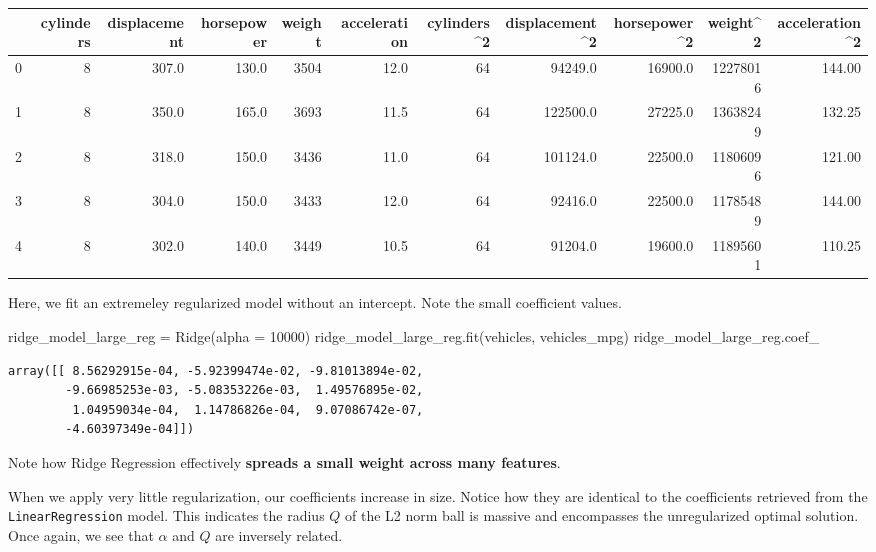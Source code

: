\documentclass[
  letterpaper,
  DIV=11,
  numbers=noendperiod]{scrreprt}
\newenvironment{Shaded}{\begin{snugshade}}{\end{snugshade}}
\newcommand{\DecValTok}[1]{\textcolor[rgb]{0.68,0.00,0.00}{#1}}
\newcommand{\NormalTok}[1]{\textcolor[rgb]{0.00,0.23,0.31}{#1}}
\newcommand{\OperatorTok}[1]{\textcolor[rgb]{0.37,0.37,0.37}{#1}}
\begin{document}
\begin{tabular}{lrrrrrrrrrr}
\toprule
{} &  cylinders &  displacement &  horsepower &  weight &  acceleration &  cylinders\textasciicircum 2 &  displacement\textasciicircum 2 &  horsepower\textasciicircum 2 &  weight\textasciicircum 2 &  acceleration\textasciicircum 2 \\
\midrule
0 &          8 &         307.0 &       130.0 &    3504 &          12.0 &           64 &         94249.0 &       16900.0 &  12278016 &          144.00 \\
1 &          8 &         350.0 &       165.0 &    3693 &          11.5 &           64 &        122500.0 &       27225.0 &  13638249 &          132.25 \\
2 &          8 &         318.0 &       150.0 &    3436 &          11.0 &           64 &        101124.0 &       22500.0 &  11806096 &          121.00 \\
3 &          8 &         304.0 &       150.0 &    3433 &          12.0 &           64 &         92416.0 &       22500.0 &  11785489 &          144.00 \\
4 &          8 &         302.0 &       140.0 &    3449 &          10.5 &           64 &         91204.0 &       19600.0 &  11895601 &          110.25 \\
\bottomrule
\end{tabular}

Here, we fit an extremeley regularized model without an intercept. Note
the small coefficient values.

\begin{Shaded}
\begin{Highlighting}[]
\NormalTok{ridge\_model\_large\_reg }\OperatorTok{=}\NormalTok{ Ridge(alpha }\OperatorTok{=} \DecValTok{10000}\NormalTok{)}
\NormalTok{ridge\_model\_large\_reg.fit(vehicles, vehicles\_mpg)}
\NormalTok{ridge\_model\_large\_reg.coef\_}
\end{Highlighting}
\end{Shaded}

\begin{verbatim}
array([[ 8.56292915e-04, -5.92399474e-02, -9.81013894e-02,
        -9.66985253e-03, -5.08353226e-03,  1.49576895e-02,
         1.04959034e-04,  1.14786826e-04,  9.07086742e-07,
        -4.60397349e-04]])
\end{verbatim}

Note how Ridge Regression effectively \textbf{spreads a small weight
across many features}.

When we apply very little regularization, our coefficients increase in
size. Notice how they are identical to the coefficients retrieved from
the \texttt{LinearRegression} model. This indicates the radius \(Q\) of
the L2 norm ball is massive and encompasses the unregularized optimal
solution. Once again, we see that \(\alpha\) and \(Q\) are inversely
related.
\end{document}
